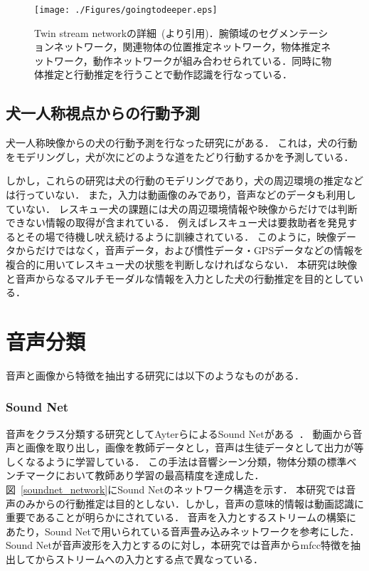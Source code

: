 \begin{figure}[htbp]
 \begin{center}
  \texttt{[image: ./Figures/goingtodeeper.eps]}
  \caption{Twin stream networkの詳細~(\cite{minghuang2016fpar}より引用)．腕領域のセグメンテーションネットワーク，関連物体の位置推定ネットワーク，物体推定ネットワーク，動作ネットワークが組み合わせられている．同時に物体推定と行動推定を行うことで動作認識を行なっている．}
  \label{twinst_image}
 \end{center}
\end{figure}


\subsection{犬一人称視点からの行動予測}
犬一人称映像からの犬の行動予測を行なった研究に\cite{whoretthedog}がある．
これは，犬の行動をモデリングし，犬が次にどのような道をたどり行動するかを予測している．

しかし，これらの研究は犬の行動のモデリングであり，犬の周辺環境の推定などは行っていない．
また，入力は動画像のみであり，音声などのデータも利用していない．
レスキュー犬の課題には犬の周辺環境情報や映像からだけでは判断できない情報の取得が含まれている．
例えばレスキュー犬は要救助者を発見するとその場で待機し吠え続けるように訓練されている．
このように，映像データからだけではなく，音声データ，および慣性データ・GPSデータなどの情報を複合的に用いてレスキュー犬の状態を判断しなければならない．
本研究は映像と音声からなるマルチモーダルな情報を入力とした犬の行動推定を目的としている． 


\section{音声分類}
音声と画像から特徴を抽出する研究には以下のようなものがある．
\subsubsection{Sound Net}
音声をクラス分類する研究としてAyterらによるSound Netがある~\cite{aytar2016soundnet}．
動画から音声と画像を取り出し，画像を教師データとし，音声は生徒データとして出力が等しくなるように学習している．
この手法は音響シーン分類，物体分類の標準ベンチマークにおいて教師あり学習の最高精度を達成した．
図~\ref{soundnet_network}にSound Netのネットワーク構造を示す．
本研究では音声のみからの行動推定は目的としない．しかし，音声の意味的情報は動画認識に重要であることが明らかにされている．
音声を入力とするストリームの構築にあたり，Sound Netで用いられている音声畳み込みネットワークを参考にした．
Sound Netが音声波形を入力とするのに対し，本研究では音声からmfcc特徴を抽出してからストリームへの入力とする点で異なっている．

